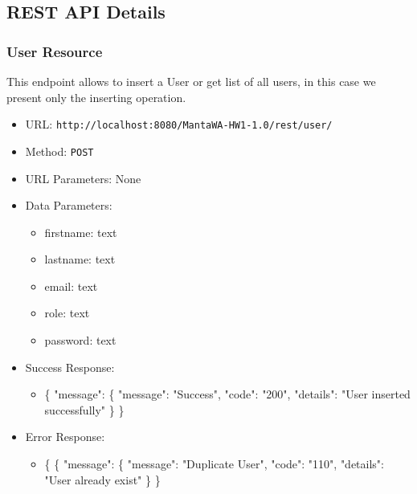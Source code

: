 \subsection{REST API Details}


\subsubsection*{User Resource}


This endpoint allows to insert a User or get list of all users, in this case we present only the inserting operation.

\begin{itemize}
    \item URL: \texttt{http://localhost:8080/MantaWA-HW1-1.0/rest/user/}
    \item Method: \texttt{POST}
    \item URL Parameters: None
    \item Data Parameters: 
    \begin{itemize}
     \item firstname: text
     \item lastname: text
     \item email: text
     \item role: text
     \item password: text
    \end{itemize}
    \item Success Response: 
     \begin{itemize}
     \item \{
    "message": \{
        "message": "Success",
        "code": "200",
        "details": "User inserted successfully"
    \}
\}
    \end{itemize}
    \item Error Response:
    \begin{itemize}
    \item 
    \{
    \{
    "message": \{
        "message": "Duplicate User",
        "code": "110",
        "details": "User already exist"
    \}
\}
    \end{itemize}
    
\end{itemize}


